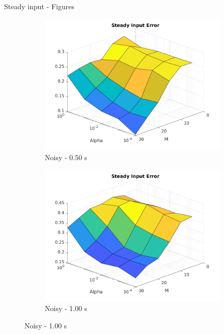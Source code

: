 \documentclass{beamer}
\begin{document}
\begin{frame}{Steady input - Figures}
\begin{figure}
        \begin{subfigure}[b]{0.3\textwidth}
            \centering
            \includegraphics[width=\textwidth]{Figures_Noisy/figure_steady_T_0.50.png}
            \caption{Noisy - 0.50 s}
            \label{fig:noisy_steady_050}
        \end{subfigure}
        \hfill
        \begin{subfigure}[b]{0.3\textwidth}
            \centering
            \includegraphics[width=\textwidth]{Figures_Noisy/figure_steady_T_1.00.png}
            \caption{Noisy - 1.00 s}
            \label{fig:noisy_steady_100}
        \end{subfigure}
        \label{fig:clean_steady}
    \end{figure}
\end{frame}
\end{document}
